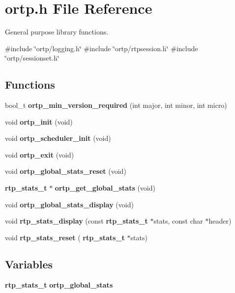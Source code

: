 \section{ortp.\+h File Reference}
\label{ortp_8h}


General purpose library functions.  


{\ttfamily \#include \char`\"{}ortp/logging.\+h\char`\"{}}\newline
{\ttfamily \#include \char`\"{}ortp/rtpsession.\+h\char`\"{}}\newline
{\ttfamily \#include \char`\"{}ortp/sessionset.\+h\char`\"{}}\newline
\subsection*{Functions}
\begin{DoxyCompactItemize}
\item 
bool\+\_\+t \textbf{ ortp\+\_\+min\+\_\+version\+\_\+required} (int major, int minor, int micro)
\item 
void \textbf{ ortp\+\_\+init} (void)
\item 
void \textbf{ ortp\+\_\+scheduler\+\_\+init} (void)
\item 
void \textbf{ ortp\+\_\+exit} (void)
\item 
\mbox{\label{ortp_8h_a65efb3c4d9efc26f0b8e76723814e52f}} 
void {\bfseries ortp\+\_\+global\+\_\+stats\+\_\+reset} (void)
\item 
\mbox{\label{ortp_8h_ad85430e4ac2d58bed0161c8085e16ee3}} 
\textbf{ rtp\+\_\+stats\+\_\+t} $\ast$ {\bfseries ortp\+\_\+get\+\_\+global\+\_\+stats} (void)
\item 
void \textbf{ ortp\+\_\+global\+\_\+stats\+\_\+display} (void)
\item 
void \textbf{ rtp\+\_\+stats\+\_\+display} (const \textbf{ rtp\+\_\+stats\+\_\+t} $\ast$stats, const char $\ast$header)
\item 
\mbox{\label{ortp_8h_a9840903a5632f77514f0e12af04f3abf}} 
void {\bfseries rtp\+\_\+stats\+\_\+reset} (\textbf{ rtp\+\_\+stats\+\_\+t} $\ast$stats)
\end{DoxyCompactItemize}
\subsection*{Variables}
\begin{DoxyCompactItemize}
\item 
\mbox{\label{ortp_8h_af34bbd80494df1ad8c62d2a79fcf8190}} 
\textbf{ rtp\+\_\+stats\+\_\+t} {\bfseries ortp\+\_\+global\+\_\+stats}
\end{DoxyCompactItemize}



